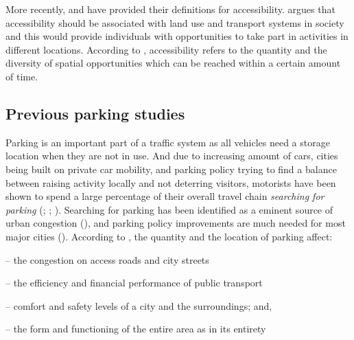 More recently,  and  have provided their definitions for accessibility. \citeauthor{Geurs2004} argues that accessibility should be associated with land use and transport systems in society and this would provide individuals with opportunities to take part in activities in different locations. According to \cite{Bertolini2003}, accessibility refers to the quantity and the diversity of spatial opportunities which can be reached within a certain amount of time.

\newpage
\subsection{Previous parking studies}
\justify

Parking is an important part of a traffic system as all vehicles need a storage location when they are not in use. And due to increasing amount of cars, cities being built on private car mobility, and parking policy trying to find a balance between raising activity locally and not deterring visitors, motorists have been shown to spend a large percentage of their overall travel chain \textit{searching for parking} (\cite{Axhausen1991}; \cite{Marsden2006}; \cite{Shoup2006}). Searching for parking has been identified as a eminent source of urban congestion (\cite{Axhausen1993}), and parking policy improvements are much needed for most major cities (\cite{Benenson2008a}). According to \cite{Young1991}, the quantity and the location of parking affect:

\begin{itemize}
    \begin{singlespace}
        \item[--] the congestion on access roads and city streets
        \item[--] the efficiency and financial performance of public transport
        \item[--] comfort and safety levels of a city and the surroundings; and,
        \item[--] the form and functioning of the entire area as in its entirety
    \end{singlespace}
\end{itemize}

